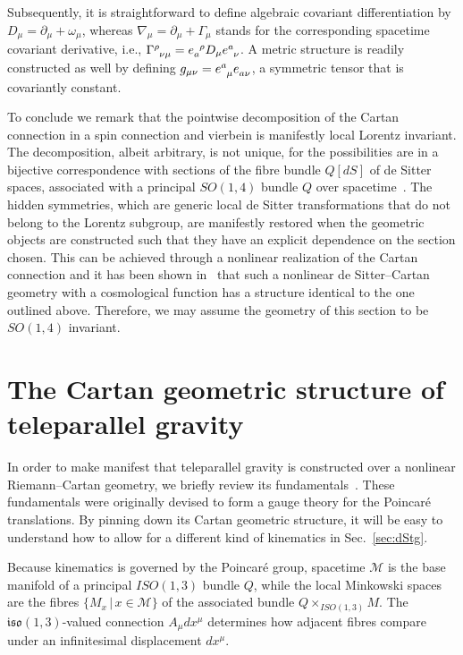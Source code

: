 \documentclass[%
aps,
prd,
reprint
]{revtex4-1}
\newcommand{\ind}{\indices}
\def\mf{\mathfrak}
\def\pd{\partial}
\def\mc{\mathcal}
\begin{document}
Subsequently, it is straightforward to define algebraic covariant 
differentiation by $D_\mu = \pd_\mu + \omega_\mu$, whereas 
$\nabla_\mu = \pd_\mu + \Gamma_\mu$ stands for the corresponding 
spacetime covariant derivative, i.e., $\Gamma\ind{^\rho_{\nu\mu}} 
= e\ind{_a^\rho} D_\mu e\ind{^a_\nu}$. A metric structure is 
readily constructed as well by defining $g_{\mu\nu} 
= e\ind{^a_\mu} e\ind{_{a\nu}}$, a symmetric tensor that is 
covariantly constant.

To conclude we remark that the pointwise decomposition of the 
Cartan connection in a spin connection and vierbein is manifestly 
local Lorentz invariant. The decomposition, albeit arbitrary, is 
not unique, for the possibilities are in a bijective 
correspondence with sections of the fibre bundle $Q[dS]$ of de 
Sitter spaces, associated with a principal $SO(1,4)$ bundle $Q$ 
over spacetime~\cite{husemoller:1966fibre}. The hidden 
symmetries, which are generic local de Sitter transformations 
that do not belong to the Lorentz subgroup, are manifestly 
restored when the geometric objects are constructed such that 
they have an explicit dependence on the section chosen.  This can 
be achieved through a nonlinear realization of the Cartan 
connection and it has been shown in~\cite{Jennen:2014mba} that 
such a nonlinear de Sitter--Cartan geometry with a cosmological 
function has a structure identical to the one outlined above.  
Therefore, we may assume the geometry of this section to be 
$SO(1,4)$ invariant.

\section{The Cartan geometric structure of teleparallel gravity}
\label{sec:tg}

In order to make manifest that teleparallel gravity is 
constructed over a nonlinear Riemann--Cartan geometry, we briefly 
review its fundamentals~\cite{aldrovandi:2012tele}. These 
fundamentals were originally devised to form a gauge theory for 
the Poincar\'e translations. By pinning down its Cartan geometric 
structure, it will be easy to understand how to allow for 
a different kind of kinematics in Sec.~\ref{sec:dStg}.

Because kinematics is governed by the Poincar\'e group, spacetime 
$\mc{M}$ is the base manifold of a principal $ISO(1,3)$ bundle 
$Q$, while the local Minkowski spaces are the fibres $\{M_x \,|\, 
x \in \mc{M}\}$ of the associated bundle $Q \times_{ISO(1,3)}M$.  
The $\mf{iso}(1,3)$-valued connection $A_\mu dx^\mu$ determines 
how adjacent fibres compare under an infinitesimal displacement 
$dx^\mu$.
\end{document}
